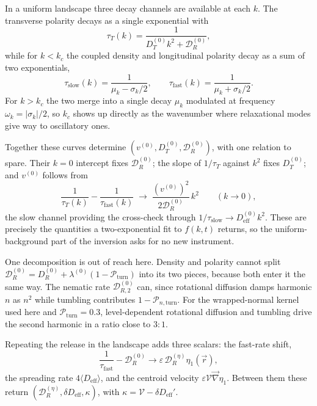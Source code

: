 \documentclass[
  reprint,
  superscriptaddress,
  amsmath,
  amssymb,
  aps,
  pre,
  nofootinbib,
  floatfix
]{revtex4-2}
\newcommand{\rv}{\vec r}
\newcommand{\grad}{\vec{\nabla}}
\newcommand{\Pturn}{\mathcal P_{\mathrm{turn}}}
\newcommand{\DR}{\mathcal D_R^{(0)}}
\newcommand{\DRtwo}{\mathcal D_{R,2}^{(0)}}
\begin{document}
In a uniform landscape three decay channels are available at each $k$.  The
transverse polarity decays as a single exponential with
\begin{equation}
 \tau_T(k) = \frac{1}{D_T^{(0)}k^2+\DR},
 \label{eq:tau-transverse}
\end{equation}
while for $k<k_c$ the coupled density and longitudinal polarity decay as a sum
of two exponentials,
\begin{equation}
 \tau_{\text{slow}}(k)=\frac{1}{\mu_k-\sigma_k/2}, \qquad
 \tau_{\text{fast}}(k)=\frac{1}{\mu_k+\sigma_k/2}.
 \label{eq:tau-slow-fast}
\end{equation}
For $k>k_c$ the two merge into a single decay $\mu_k$ modulated at frequency
$\omega_k=|\sigma_k|/2$, so $k_c$ shows up directly as the wavenumber where
relaxational modes give way to oscillatory ones.

Together these curves determine $(v^{(0)},D_T^{(0)},\DR)$, with one relation
to spare.  Their $k=0$ intercept fixes $\DR$; the slope of $1/\tau_T$ against
$k^2$ fixes $D_T^{(0)}$; and $v^{(0)}$ follows from
\begin{equation}
 \frac1{\tau_T(k)}-\frac1{\tau_{\text{fast}}(k)}
 \;\longrightarrow\; \frac{(v^{(0)})^2}{2\DR}\,k^2
 \qquad (k\to0),
 \label{eq:v0-extraction}
\end{equation}
the slow channel providing the cross-check through
$1/\tau_{\text{slow}}\to D_{\mathrm{eff}}^{(0)}k^2$.  These are precisely the
quantities a two-exponential fit to $f(k,t)$ returns, so the
uniform-background part of the inversion asks for no new instrument.

One decomposition is out of reach here.  Density and polarity cannot split
$\DR=D_R^{(0)}+\lambda^{(0)}(1-\Pturn)$ into its two pieces, because both
enter it the same way.  The nematic rate $\DRtwo$ can, since rotational
diffusion damps harmonic $n$ as $n^2$ while tumbling contributes
$1-\mathcal P_{n,\mathrm{turn}}$.  For the wrapped-normal kernel used here and
$\Pturn=0.3$, level-dependent rotational diffusion and tumbling drive the
second harmonic in a ratio close to $3:1$.

Repeating the release in the landscape adds three scalars: the fast-rate shift,
\begin{equation}
 \frac1{\tau_{\text{fast}}}-\DR
 \to \varepsilon\,\mathcal D_R^{(\eta)}\eta_1(\rv),
 \label{eq:mode-inversion-fast}
\end{equation}
the spreading rate $4\langle D_{\mathrm{eff}}\rangle$, and the centroid
velocity $\varepsilon\mathcal V\grad\eta_1$.  Between them these return
$(\mathcal D_R^{(\eta)},\delta D_{\mathrm{eff}},\kappa)$, with
$\kappa=\mathcal V-\delta D_{\mathrm{eff}}'$.
\end{document}
